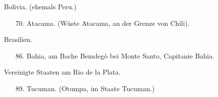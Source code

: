 \documentclass[a4paper, 11pt, oneside, polutonikogreek, german]{article}
\begin{document}
\begin{center}
Bolivia. (ehemals Peru.)
\end{center}
\begin{itemize}
    \small
    \item[70.] Atacama. (Wüste Atacama, an der Grenze von Chili).
\end{itemize}
\begin{center}
Brasilien.
\end{center}
\begin{itemize}
    \small
    \item[86.] Bahia, am Bache Bemdegò bei Monte Santo, Capitanie Bahia.
\end{itemize}
\begin{center}
Vereinigte Staaten am Rio de la Plata.
\end{center}
\begin{itemize}
    \small
    \item[89.] Tucuman. (Otumpa, im Staate Tucuman.)
\end{itemize}
\clearpage
\end{document}
